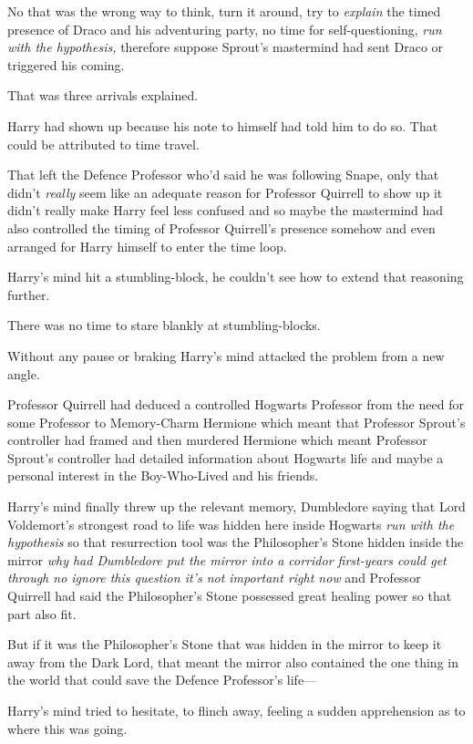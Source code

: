 No that was the wrong way to think, turn it around, try to \emph{explain} the
timed presence of Draco and his adventuring party, no time for
self-questioning, \emph{run with the hypothesis,} therefore suppose Sprout's
mastermind had sent Draco or triggered his coming.

That was three arrivals explained.

Harry had shown up because his note to himself had told him to do so. That
could be attributed to time travel.

That left the Defence Professor who'd said he was following Snape, only that
didn't \emph{really} seem like an adequate reason for Professor Quirrell to
show up it didn't really make Harry feel less confused and so maybe the
mastermind had also controlled the timing of Professor Quirrell's presence
somehow and even arranged for Harry himself to enter the time loop.

Harry's mind hit a stumbling-block, he couldn't see how to extend that
reasoning further.

There was no time to stare blankly at stumbling-blocks.

Without any pause or braking Harry's mind attacked the problem from a new angle.

Professor Quirrell had deduced a controlled Hogwarts Professor from the need
for some Professor to Memory-Charm Hermione which meant that Professor Sprout's
controller had framed and then murdered Hermione which meant Professor Sprout's
controller had detailed information about Hogwarts life and maybe a personal
interest in the Boy-Who-Lived and his friends.

Harry's mind finally threw up the relevant memory, Dumbledore saying that Lord
Voldemort's strongest road to life was hidden here inside Hogwarts \emph{run
with the hypothesis} so that resurrection tool was the Philosopher's Stone
hidden inside the mirror \emph{why had Dumbledore put the mirror into a
corridor first-years could get through no ignore this question it's not
important right now} and Professor Quirrell had said the Philosopher's Stone
possessed great healing power so that part also fit.

But if it was the Philosopher's Stone that was hidden in the mirror to keep it
away from the Dark Lord, that meant the mirror also contained the one thing in
the world that could save the Defence Professor's life—

Harry's mind tried to hesitate, to flinch away, feeling a sudden apprehension
as to where this was going.

